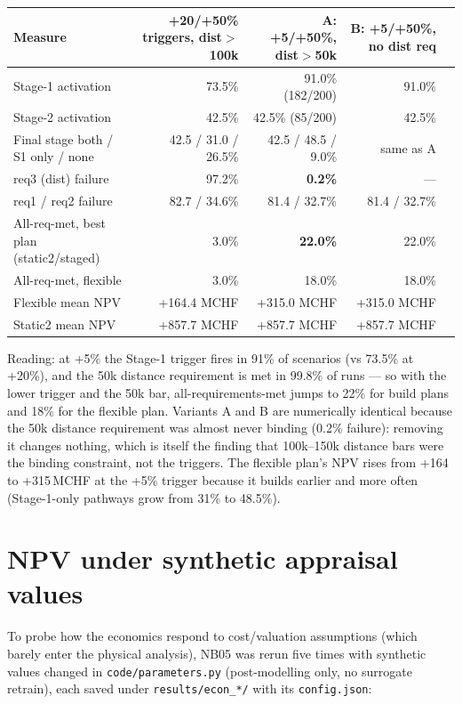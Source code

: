 \documentclass[10pt,a4paper]{article}
\begin{document}
\begin{tabular}{@{}lrrrr@{}}
\toprule
Measure & +20/+50\% triggers, dist${>}$100k & A: +5/+50\%, dist${>}$50k & B: +5/+50\%, no dist req \\
\midrule
Stage-1 activation & 73.5\% & 91.0\% (182/200) & 91.0\% \\
Stage-2 activation & 42.5\% & 42.5\% (85/200) & 42.5\% \\
Final stage both / S1 only / none & 42.5 / 31.0 / 26.5\% & 42.5 / 48.5 / 9.0\% & same as A \\
req3 (dist) failure & 97.2\% & \textbf{0.2\%} & --- \\
req1 / req2 failure & 82.7 / 34.6\% & 81.4 / 32.7\% & 81.4 / 32.7\% \\
All-req-met, best plan (static2/staged) & 3.0\% & \textbf{22.0\%} & 22.0\% \\
All-req-met, flexible & 3.0\% & 18.0\% & 18.0\% \\
Flexible mean NPV & +164.4 MCHF & +315.0 MCHF & +315.0 MCHF \\
Static2 mean NPV & +857.7 MCHF & +857.7 MCHF & +857.7 MCHF \\
\bottomrule
\end{tabular}

Reading: at +5\% the Stage-1 trigger fires in 91\% of scenarios (vs 73.5\% at +20\%), and the
50k distance requirement is met in 99.8\% of runs --- so with the lower trigger and the
50k bar, all-requirements-met jumps to 22\% for build plans and 18\% for the flexible plan.
Variants A and B are numerically identical because the 50k distance requirement was almost
never binding (0.2\% failure): removing it changes nothing, which is itself the finding that
100k--150k distance bars were the binding constraint, not the triggers. The flexible plan's
NPV rises from +164 to +315\,MCHF at the +5\% trigger because it builds earlier and more
often (Stage-1-only pathways grow from 31\% to 48.5\%).

\section{NPV under synthetic appraisal values}
To probe how the economics respond to cost/valuation assumptions (which barely enter the
physical analysis), NB05 was rerun five times with synthetic values changed in
\texttt{code/parameters.py} (post-modelling only, no surrogate retrain), each saved under
\texttt{results/econ\_*/} with its \texttt{config.json}:
\end{document}
